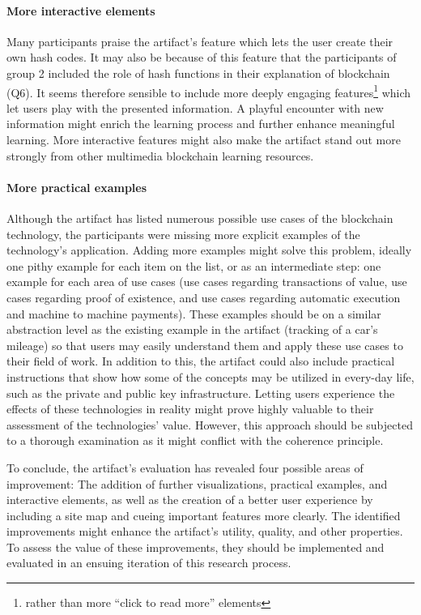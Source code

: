 \paragraph{More interactive elements} Many participants praise the artifact's feature which lets the user create their own hash codes. It may also be because of this feature that the participants of group 2 included the role of hash functions in their explanation of blockchain (Q6). It seems therefore sensible to include more deeply engaging features\footnote{rather than more \enquote{click to read more} elements} which let users play with the presented information. A playful encounter with new information might enrich the learning process and further enhance meaningful learning. More interactive features might also make the artifact stand out more strongly from other multimedia blockchain learning resources. 

\paragraph{More practical examples} Although the artifact has listed numerous possible use cases of the blockchain technology, the participants were missing more explicit examples of the technology's application. Adding more examples might solve this problem, ideally one pithy example for each item on the list, or as an intermediate step: one example for each area of use cases (use cases regarding transactions of value, use cases regarding proof of existence, and use cases regarding automatic execution and machine to machine payments). These examples should be on a similar abstraction level as the existing example in the artifact (tracking of a car's mileage) so that users may easily understand them and apply these use cases to their field of work. In addition to this, the artifact could also include practical instructions that show how some of the concepts may be utilized in every-day life, such as the private and public key infrastructure. Letting users experience the effects of these technologies in reality might prove highly valuable to their assessment of the technologies' value. However, this approach should be subjected to a thorough examination as it might conflict with the coherence principle.

To conclude, the artifact's evaluation has revealed four possible areas of improvement: The addition of further visualizations, practical examples, and interactive elements, as well as the creation of a better user experience by including a site map and cueing important features more clearly. The identified improvements might enhance the artifact's utility, quality, and other properties. To assess the value of these improvements, they should be implemented and evaluated in an ensuing iteration of this research process.